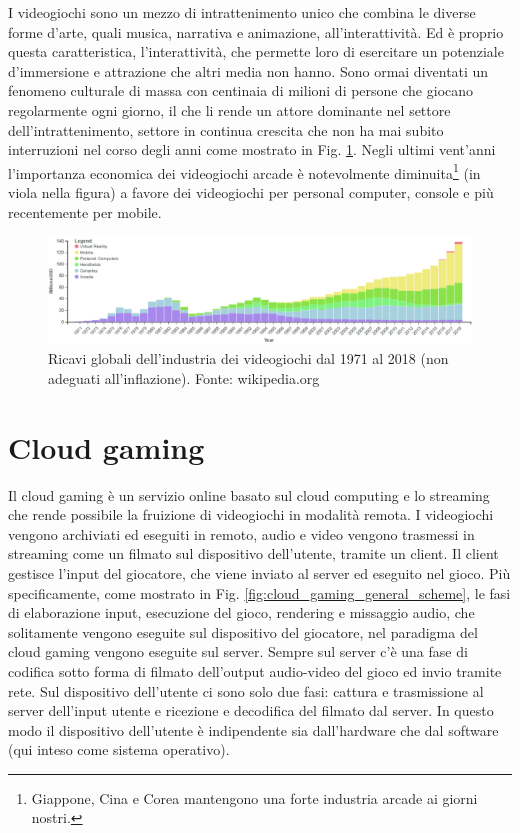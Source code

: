 I videogiochi sono un mezzo di intrattenimento unico che combina le diverse forme d'arte, quali musica, narrativa e animazione, all'interattività. Ed è proprio questa caratteristica, l'interattività, che permette loro di esercitare un potenziale d'immersione e attrazione che altri media non hanno. Sono ormai diventati un fenomeno culturale di massa con centinaia di milioni di persone che giocano regolarmente ogni giorno, il che li rende un attore dominante nel settore dell'intrattenimento, settore in continua crescita che non ha mai subito interruzioni nel corso degli anni come mostrato in Fig. \ref{fig:valore_commerciale_giochi_globale}. Negli ultimi vent'anni l'importanza economica dei videogiochi arcade è notevolmente diminuita\footnote{Giappone, Cina e Corea mantengono una forte industria arcade ai giorni nostri.} (in viola nella figura) a favore dei videogiochi per personal computer, console e più recentemente per mobile.

\begin{figure}[H]
	\includegraphics[width=\linewidth]{immagini/valore_commerciale_giochi_globale.png}
	\caption{Ricavi globali dell'industria dei videogiochi dal 1971 al 2018 (non adeguati all'inflazione). Fonte: wikipedia.org}
	\label{fig:valore_commerciale_giochi_globale}
\end{figure}




\section{Cloud gaming}
Il cloud gaming è un servizio online basato sul cloud computing e lo streaming che rende possibile la fruizione di videogiochi in modalità remota. I videogiochi vengono archiviati ed eseguiti in remoto, audio e video vengono trasmessi in streaming come un filmato sul dispositivo dell'utente, tramite un client. Il client gestisce l'input del giocatore, che viene inviato al server ed eseguito nel gioco. Più specificamente, come mostrato in Fig. \ref{fig:cloud_gaming_general_scheme}, le fasi di elaborazione input, esecuzione del gioco, rendering e missaggio audio, che solitamente vengono eseguite sul dispositivo del giocatore, nel paradigma del cloud gaming vengono eseguite sul server. Sempre sul server c'è una fase di codifica sotto forma di filmato dell'output audio-video del gioco ed invio tramite rete. Sul dispositivo dell'utente ci sono solo due fasi: cattura e trasmissione al server dell'input utente e ricezione e decodifica del filmato dal server. In questo modo il dispositivo dell'utente è indipendente sia dall'hardware che dal software (qui inteso come sistema operativo).

